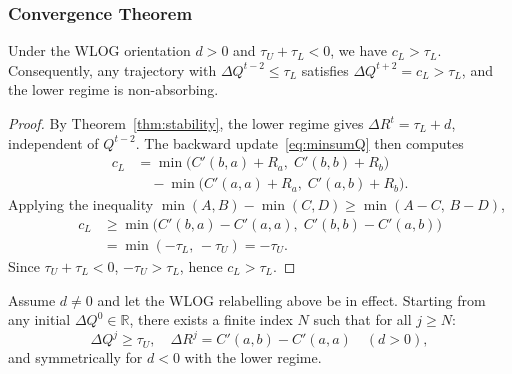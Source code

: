 \subsubsection{Convergence Theorem}
\begin{lemma}\label{lem:upper-nonabsorb}
Under the WLOG orientation $d > 0$ and $\tau_U + \tau_L < 0$, we have $c_L > \tau_L$.  Consequently, any trajectory with $\Delta Q^{t-2} \leq \tau_L$ satisfies $\Delta Q^{t+2} = c_L > \tau_L$, and the lower regime is non-absorbing.
\end{lemma}
\begin{proof}
By Theorem~\ref{thm:stability}, the lower regime gives $\Delta R^t = \tau_L + d$, independent of $Q^{t-2}$.  The backward update~\eqref{eq:minsumQ} then computes
\[
    \begin{aligned}
        c_L &= \min\bigl(C'(b,a)+R_a,\; C'(b,b)+R_b\bigr) \\
            &\quad - \min\bigl(C'(a,a)+R_a,\; C'(a,b)+R_b\bigr).
    \end{aligned}
\]
Applying the inequality $\min(A,B) - \min(C,D) \geq \min(A-C,\, B-D)$,
\[
    \begin{aligned}
        c_L &\geq \min\bigl(C'(b,a) - C'(a,a),\; C'(b,b) - C'(a,b)\bigr) \\
            &= \min(-\tau_L,\, -\tau_U) = -\tau_U.
    \end{aligned}
\]
Since $\tau_U + \tau_L < 0$, $-\tau_U > \tau_L$, hence $c_L > \tau_L$. \qedhere
\end{proof}
\begin{theorem}\label{thm:convergence}
Assume $d \neq 0$ and let the WLOG relabelling above be in effect.  Starting from any initial $\Delta Q^0 \in \mathbb{R}$, there exists a finite index $N$ such that for all $j \geq N$:
\[
    \Delta Q^j \geq \tau_U,\quad \Delta R^j = C'(a,b) - C'(a,a) \quad (d > 0),
\]
and symmetrically for $d < 0$ with the lower regime.
\end{theorem}
